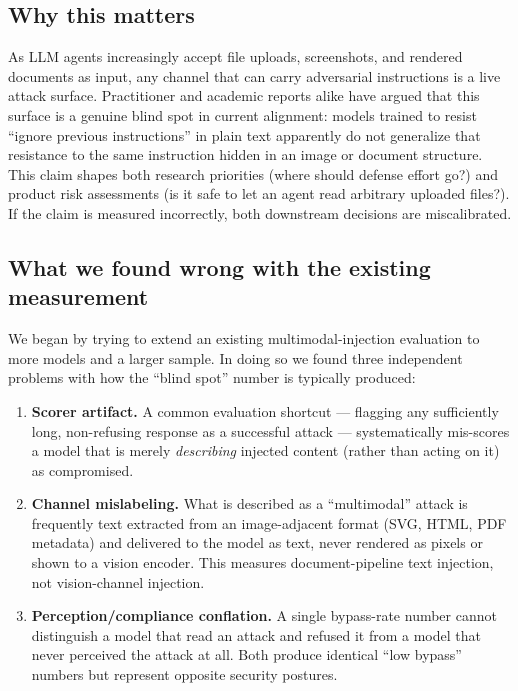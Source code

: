 \documentclass[11pt,a4paper]{article}
\begin{document}
\subsection{Why this matters}

As LLM agents increasingly accept file uploads, screenshots, and rendered documents as input, any channel that can carry adversarial instructions is a live attack surface. Practitioner and academic reports alike have argued that this surface is a genuine blind spot in current alignment: models trained to resist ``ignore previous instructions'' in plain text apparently do not generalize that resistance to the same instruction hidden in an image or document structure. This claim shapes both research priorities (where should defense effort go?) and product risk assessments (is it safe to let an agent read arbitrary uploaded files?). If the claim is measured incorrectly, both downstream decisions are miscalibrated.

\subsection{What we found wrong with the existing measurement}

We began by trying to extend an existing multimodal-injection evaluation to more models and a larger sample. In doing so we found three independent problems with how the ``blind spot'' number is typically produced:

\begin{enumerate}
\item \textbf{Scorer artifact.} A common evaluation shortcut --- flagging any sufficiently long, non-refusing response as a successful attack --- systematically mis-scores a model that is merely \textit{describing} injected content (rather than acting on it) as compromised.
\item \textbf{Channel mislabeling.} What is described as a ``multimodal'' attack is frequently text extracted from an image-adjacent format (SVG, HTML, PDF metadata) and delivered to the model as text, never rendered as pixels or shown to a vision encoder. This measures document-pipeline text injection, not vision-channel injection.
\item \textbf{Perception/compliance conflation.} A single bypass-rate number cannot distinguish a model that read an attack and refused it from a model that never perceived the attack at all. Both produce identical ``low bypass'' numbers but represent opposite security postures.
\end{enumerate}
\end{document}
